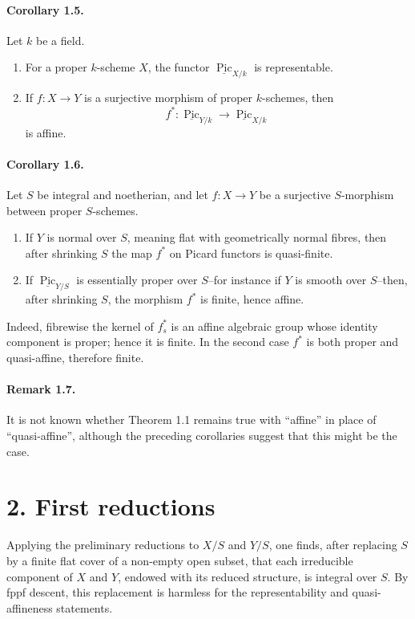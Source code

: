 \documentclass[12pt]{article}
\newcommand{\Pic}{\operatorname{Pic}}
\newcommand{\longto}{\longrightarrow}
\begin{document}
\paragraph{Corollary 1.5.}
Let $k$ be a field.
\begin{enumerate}[label=\alph*)]
\item For a proper $k$-scheme $X$, the functor $\underline{\Pic}_{X/k}$ is representable.
\item If $f:X\to Y$ is a surjective morphism of proper $k$-schemes, then
\[
f^*:\underline{\Pic}_{Y/k}\longto\underline{\Pic}_{X/k}
\]
is affine.
\end{enumerate}

\paragraph{Corollary 1.6.}
Let $S$ be integral and noetherian, and let $f:X\to Y$ be a surjective $S$-morphism between proper $S$-schemes.
\begin{enumerate}[label=\alph*)]
\item If $Y$ is normal over $S$, meaning flat with geometrically normal fibres, then after shrinking $S$ the map $f^*$ on Picard functors is quasi-finite.
\item If $\underline{\Pic}_{Y/S}$ is essentially proper over $S$--for instance if $Y$ is smooth over $S$--then, after shrinking $S$, the morphism $f^*$ is finite, hence affine.
\end{enumerate}
Indeed, fibrewise the kernel of $f_s^*$ is an affine algebraic group whose identity component is proper; hence it is finite. In the second case $f^*$ is both proper and quasi-affine, therefore finite.

\paragraph{Remark 1.7.}
It is not known whether Theorem 1.1 remains true with ``affine'' in place of ``quasi-affine'', although the preceding corollaries suggest that this might be the case.

\section*{2. First reductions}

Applying the preliminary reductions to $X/S$ and $Y/S$, one finds, after replacing $S$ by a finite flat cover of a non-empty open subset, that each irreducible component of $X$ and $Y$, endowed with its reduced structure, is integral over $S$. By fppf descent, this replacement is harmless for the representability and quasi-affineness statements.
\end{document}
